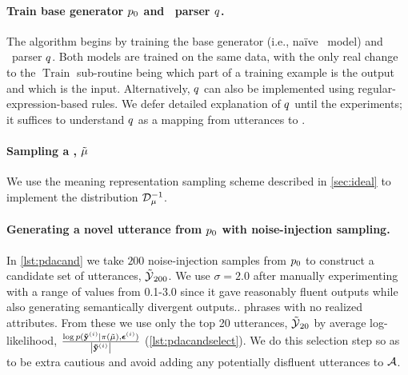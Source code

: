 \paragraph{{Train base generator $p_0$ and
\meaningrepresentation~parser $q$.}} 
The algorithm begins by training the
base generator (i.e., na{\"i}ve \sequencetosequence~model) and
\meaningrepresentation~parser $q$.  Both models are trained on the same
data, with the only real change to the $\operatorname{Train}$ sub-routine being
which part of a training example is the output and which is the input.
Alternatively, $q$ can also be implemented using regular-expression-based
rules. We defer detailed explanation of $q$ until the experiments; it
suffices to understand $q$ as a mapping from utterances to
\meaningrepresentations.

\paragraph{{Sampling a \meaningrepresentation, $\tilde{\mu}$}}
We use the meaning representation sampling scheme described in
\autoref{sec:ideal} to implement the distribution $\mathcal{D}_{\mu}^{-1}$. 

\paragraph{{Generating a novel utterance from $p_0$ with
noise-injection sampling.}} 
In \autoref{lst:pdacand} we take $200$
noise-injection samples from $p_0$ to construct a candidate set of
utterances, $\mathcal{\tilde{\mathcal{Y}}}_{200}$.  We use $\sigma=2.0$ after manually
experimenting with a range of values from 0.1-3.0 since it gave reasonably
fluent outputs while also generating semantically divergent outputs..  phrases
with no realized attributes.  From these we use only the top 20 utterances,
$\mathcal{\tilde{\mathcal{Y}}}_{20}$ by average log-likelihood,
$\frac{\log p(\boldsymbol{\tilde{\mathbf{y}}}^{(i)}|\pi(\tilde{\mu}),
\boldsymbol{\epsilon}^{(i)})}{{\left\vert \boldsymbol{\tilde{\mathbf{y}}}^{(i)} \right\vert}}$
(\autoref{lst:pdacandselect}).  We do this selection step so as to be extra
cautious and avoid adding any potentially disfluent utterances to ${\mathcal{A}}$.
    
